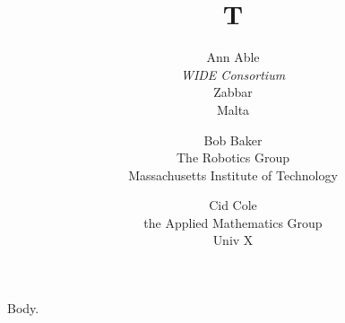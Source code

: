 \documentclass{article}
\begin{document}
\title{T}
\author{Ann Able\\ \textit{WIDE Consortium}\\ Zabbar\\ Malta \and Bob Baker\\ The Robotics Group\\ Massachusetts
Institute of Technology \and Cid Cole\\ the Applied Mathematics Group\\ Univ X}
\maketitle
Body.
\end{document}
